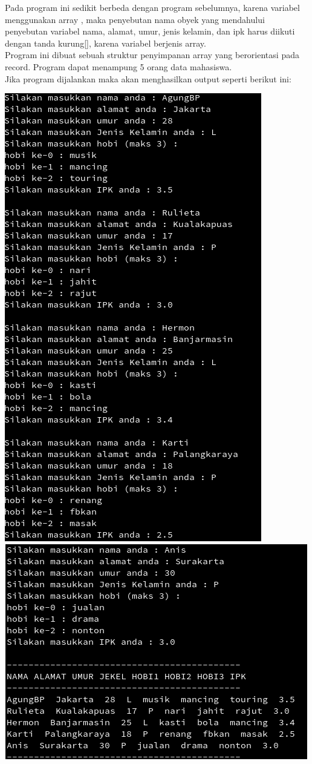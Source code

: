 \documentclass[a4paper,12pt]{article}
\begin{document}
Pada program ini sedikit berbeda dengan program sebelumnya, karena variabel menggunakan array , maka penyebutan nama
obyek yang mendahului penyebutan variabel nama, alamat, umur, jenis kelamin, dan ipk harus diikuti dengan tanda
kurung[], karena variabel berjenis array.\\
Program ini dibuat sebuah struktur penyimpanan array yang berorientasi pada record. Program dapat menampung 5 orang
data mahasiswa.\\
Jika program dijalankan maka akan menghasilkan output seperti berikut ini:
\begin{center}
    \includegraphics[scale=.7]{prog34a.png} 
    \includegraphics[scale=.7]{prog34b.png} 

\end{center}
\end{document}
